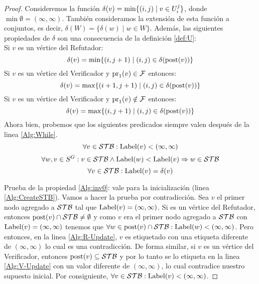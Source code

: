 \begin{proof}
	Consideremos la función  $\delta(v) = \min \{(i,j) \mid v \in U^j_i\}$, donde $\min \emptyset = (\infty, \infty)$.
También consideramos la extensión de esta función a conjuntos, es decir, $\delta(W) = \{\delta(w) \mid w \in W \}$. 
Además, las siguientes propiedades de $\delta$ son una consecuencia de la definición \ref{def:U}: \\

\noindent
Si $v$ es un vértice del Refutador:
\begin{equation}\label{prop:delta-1}
 \delta(v)  = \min \{(i,j+1) \mid (i,j) \in \delta(\operatorname{post}(v)) \}
\end{equation}
Si $v$ es un vértice del Verificador y $\operatorname{pr}_{1}(v) \in \mathcal{F}$ entonces:
\begin{equation}\label{prop:delta-2}
 \delta(v)  = \max \{(i+1,j+1) \mid (i,j) \in \delta(\operatorname{post}(v)) \}
\end{equation}
Si $v$ es un vértice del Verificador y $\operatorname{pr}_{1}(v) \notin \mathcal{F}$ entonces:
\begin{equation}\label{prop:delta-3}
 \delta(v) = \max \{(i,j+1) \mid (i,j) \in \delta(\operatorname{post}(v)) \}
\end{equation}
	Ahora bien, probemos que los siguientes predicados siempre valen después de la linea \ref{Alg:While}.
\begin{equation}\label{Alg:inv0}
	\forall v \in \mathcal{STB} : \operatorname{Label}(v) < (\infty, \infty)
\end{equation}
\begin{equation}\label{Alg:inv1}
	\forall w, v \in S^G : v \in \mathcal{STB} \wedge \operatorname{Label}(w) < \operatorname{Label}(v) \Rightarrow w \in \mathcal{STB}
\end{equation}
\begin{equation}\label{Alg:inv2}
	\forall v \in \mathcal{STB} : \operatorname{Label}(v) = \delta(v)
\end{equation}

	Prueba de la propiedad \ref{Alg:inv0}: vale para la inicialización (linea \ref{Alg:CreateSTB}). Vamos a hacer la prueba por contradicción. 
Sea $v$ el primer nodo agregado a $\mathcal{STB}$ tal que $\operatorname{Label}(v) = (\infty, \infty)$.
Si es un vértice del Refutador, entonces $\operatorname{post}(v) \cap \mathcal{STB} \neq \emptyset$ y como $v$ era el primer nodo agregado a $\mathcal{STB}$ con 
$\operatorname{Label}(v) = (\infty, \infty)$ tenemos que $\forall w \in \operatorname{post}(v) \cap \mathcal{STB}: \operatorname{Label}(w) < (\infty, \infty)$. Pero entonces, en la linea \ref{Alg:R-Update},
$v$ es etiquetado con una etiqueta diferente de $(\infty, \infty)$ lo cual es una contradicción. 
De forma similar, si $v$ es un vértice del Verificador, entonces $\operatorname{post}(v) \subseteq \mathcal{STB}$ y 
por lo tanto se lo etiqueta en la linea \ref{Alg:V-Update} con un valor diferente de $(\infty, \infty)$, lo cual contradice nuestro supuesto inicial. 
Por consiguiente, $\forall v \in \mathcal{STB} : \operatorname{Label}(v) < (\infty, \infty)$.


\end{proof}

